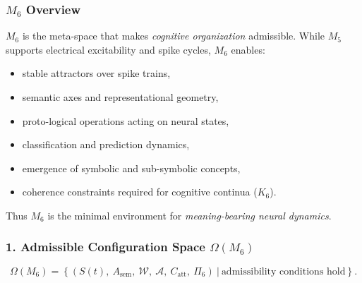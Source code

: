 

\subsubsection{\texorpdfstring{$M_6$}{M_6} Overview}
\label{sec:m6-overview}

$M_6$ is the meta-space that makes \emph{cognitive organization} admissible.
While $M_5$ supports electrical excitability and spike cycles, $M_6$ enables:

\begin{itemize}
    \item stable attractors over spike trains,
    \item semantic axes and representational geometry,
    \item proto-logical operations acting on neural states,
    \item classification and prediction dynamics,
    \item emergence of symbolic and sub-symbolic concepts,
    \item coherence constraints required for cognitive continua ($K_6$).
\end{itemize}

Thus $M_6$ is the minimal environment for \emph{meaning-bearing neural dynamics}.

\subsubsection*{1. Admissible Configuration Space \texorpdfstring{$\Omega(M_6)$}{\Omega(M_6)}}

\[
\Omega(M_6) =
\left\{
(S(t),\ A_{\mathrm{sem}},\ 
\mathcal{W},\ 
\mathcal{A},\ 
C_{\mathrm{att}},\
\Pi_6)
\ \big|\ \text{admissibility conditions hold}
\right\}.
\]

